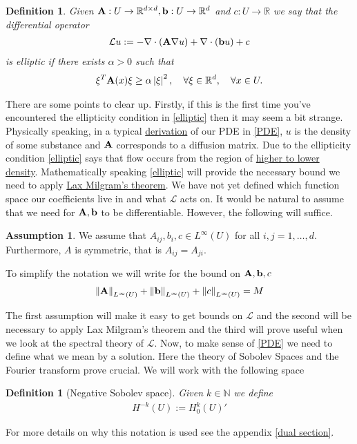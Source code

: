 \documentclass[
    a4paper,
    DIV=14,
    abstract=true,
    numbers=noenddot
]
{scrartcl}
\newtheorem{definition}[theorem]{Definition}
\theoremstyle{definition}
\newtheorem{assumption}{Assumption}
\renewcommand{\norm}[1]{\left\lVert #1 \right\rVert}\renewcommand{\abs}[1]{\left| #1 \right|}
\newcommand{\N}{\mathbb{N}}
\newcommand{\R}{\mathbb{R}}
\newcommand{\Ll}{\mathcal{L}}
\begin{document}
\begin{definition}
	Given $\vb{A}: U \to \R^{d \times d}, \vb{b}: U \to \R^d$ and $c:U \to \R$ we say that the differential operator
	\begin{align}\label{operator}
		\Ll u:= -\nabla \cdot (\vb{A} \nabla u)+ \nabla \cdot (\vb{b} u)+c\end{align}
	is \emph{elliptic} if there exists $\alpha>0$ such that
	\begin{align}\label{elliptic}
		\xi ^T\vb{A}(x) \xi  \geq \alpha \abs{\xi }^2 , \quad\forall \xi \in \R^d , \quad\forall x \in U .
	\end{align}
\end{definition}
There are some points to clear up. Firstly, if this is the first time you've encountered  the ellipticity condition in \eqref{elliptic} then it may seem a bit strange.  Physically speaking, in a typical \href{https://nowheredifferentiable.com/2023-12-23-PDEs-4-Physical_derivation_of_parabolic_and_elliptic_PDE/}{derivation} of our PDE in \eqref{PDE}, $u$ is the density of some substance and $\vb{A}$ corresponds to a diffusion matrix. Due to the ellipticity condition \eqref{elliptic} says that flow occurs from the region of \href{https://nowheredifferentiable.com/2023-12-23-PDEs-4-Physical_derivation_of_parabolic_and_elliptic_PDE/#:~:text=a)-,Diffusion,-%3A%20This%20is%20the}{higher to lower density}. Mathematically speaking \eqref{elliptic} will provide the necessary bound we need to apply \href{https://nowheredifferentiable.com/2023-05-30-PDE-2-Hilbert/#:~:text=degenerate.%20As%20a-,particular,-example%2C%20a%20symmetric}{Lax Milgram's theorem}. We have not yet defined which function space our coefficients live in and what $\Ll$ acts on. It would be natural to assume that we need for $\vb{A},\vb{b}$ to be differentiable. However, the following will suffice.
\begin{assumption}\label{Ass1}
	We assume that  $A_{ij}, b_i, c \in L^\infty (U)$ for all $i,j=1,\ldots,d$. Furthermore, $A$ is symmetric, that is  $A_{ij}=A_{ji}$.
\end{assumption}
To simplify the notation we will write for the bound on $\vb{A},\vb{b},c$
\begin{align*}
	\norm{\vb{A}}_{L^\infty(U)}+\norm{\vb{b}}_{L^\infty(U)}+\norm{c}_{L^\infty(U)}=M
\end{align*}

The first assumption will make it easy to get bounds on $\Ll$ and the second will be necessary to apply Lax Milgram's theorem and the third will prove useful when we look at the spectral theory of $\Ll$. Now, to make sense of \eqref{PDE} we need to define what we mean by a solution. Here the theory of Sobolev Spaces and the Fourier transform prove crucial. We will work with the following space
\begin{definition}[Negative Sobolev space]\label{dual definition 2}
	Given $k \in \N$ we define
	\begin{align*}
		H^{-k}(U ):= H_0^k(U )'
	\end{align*}
\end{definition}
For more details on why this notation is used see the appendix \ref{dual section}.
\end{document}

